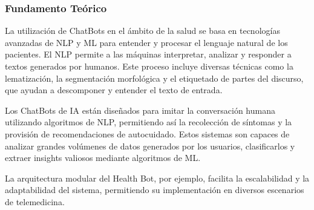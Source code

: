 	\subsubsection{Fundamento Teórico}
		La utilización de ChatBots en el ámbito de la salud se basa en tecnologías avanzadas de NLP y ML para entender y procesar el lenguaje natural de los pacientes. El NLP permite a las máquinas interpretar, analizar y responder a textos generados por humanos. Este proceso incluye diversas técnicas como la lematización, la segmentación morfológica y el etiquetado de partes del discurso, que ayudan a descomponer y entender el texto de entrada.
		
		Los ChatBots de IA están diseñados para imitar la conversación humana utilizando algoritmos de NLP, permitiendo así la recolección de síntomas y la provisión de recomendaciones de autocuidado. Estos sistemas son capaces de analizar grandes volúmenes de datos generados por los usuarios, clasificarlos y extraer insights valiosos mediante algoritmos de ML.
		
		La arquitectura modular del Health Bot, por ejemplo, facilita la escalabilidad y la adaptabilidad del sistema, permitiendo su implementación en diversos escenarios de telemedicina.

